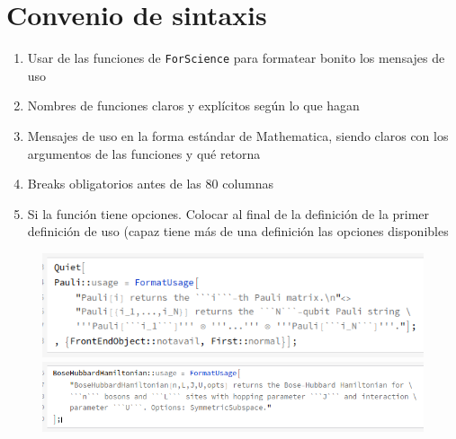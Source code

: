 \documentclass{article}
\begin{document}
\section{Convenio de sintaxis}

\begin{enumerate}
\item Usar de las funciones de \texttt{ForScience} para formatear bonito los mensajes
de uso 
\item Nombres de funciones claros y explícitos según lo que hagan
\item Mensajes de uso en la forma estándar de Mathematica, siendo claros con 
los argumentos de las funciones y qué retorna
\item Breaks obligatorios antes de las 80 columnas
\item Si la función tiene opciones. Colocar al final de la definición de la primer
definición de uso (capaz tiene más de una definición las opciones disponibles
\end{enumerate}

\begin{figure}[hbt]
\centering
\includegraphics[width=\textwidth]{estandar1.png}
\includegraphics[width=\textwidth]{estandar2.png}
\end{figure}
\end{document}
